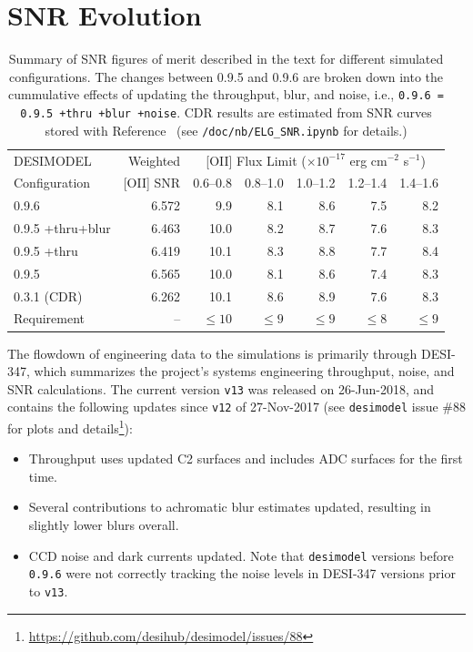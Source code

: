 \documentclass[12pt]{article}
\begin{document}
\section{SNR Evolution}

\begin{table}[htb]
\begin{center}
\begin{tabular}{lrrrrrr}
    DESIMODEL     & Weighted  & \multicolumn{5}{c}{[OII] Flux Limit ($\times 10^{-17}$ erg cm$^{-2}$ s$^{-1}$)} \\
    Configuration & [OII] SNR & 0.6--0.8 & 0.8--1.0 & 1.0--1.2 & 1.2--1.4 & 1.4--1.6 \\
    \hline
    0.9.6            &  6.572 &  9.9 &  8.1 &  8.6 &  7.5 &  8.2 \\
    0.9.5 +thru+blur &  6.463 & 10.0 &  8.2 &  8.7 &  7.6 &  8.3 \\
    0.9.5 +thru      &  6.419 & 10.1 &  8.3 &  8.8 &  7.7 &  8.4 \\
    0.9.5            &  6.565 & 10.0 &  8.1 &  8.6 &  7.4 &  8.3 \\
    0.3.1 (CDR)      &  6.262 & 10.1 &  8.6 &  8.9 &  7.6 &  8.3 \\
    \hline
    Requirement      &     -- & $\le 10$ & $\le 9$ & $\le 9$ & $\le 8$ & $\le 9$ \\
    \hline
\end{tabular}
\caption{Summary of SNR figures of merit described in the text for different simulated configurations.
The changes between 0.9.5 and 0.9.6 are broken down into the cummulative effects of updating the throughput, blur, and noise,
i.e., {\tt 0.9.6 = 0.9.5 +thru +blur +noise}.  CDR results are estimated from SNR curves stored with
Reference~\cite{desi-867} (see {\tt /doc/nb/ELG\_SNR.ipynb} for details.)}
\label{tab:results-summary}
\end{center}
\end{table}

The flowdown of engineering data to the simulations is primarily through DESI-347\cite{desi-347}, which summarizes
the project's systems engineering throughput, noise, and SNR calculations.  The current version {\tt v13} was released on 26-Jun-2018,
and contains the following updates since {\tt v12} of 27-Nov-2017 (see {\tt desimodel} issue \#88 for plots and details\footnote{
\url{https://github.com/desihub/desimodel/issues/88}}):
\begin{itemize}
    \item Throughput uses updated C2 surfaces and includes ADC surfaces for the first time.
    \item Several contributions to achromatic blur estimates updated, resulting in slightly lower blurs overall.
    \item CCD noise and dark currents updated. Note that {\tt desimodel} versions before {\tt 0.9.6} were not correctly
    tracking the noise levels in DESI-347 versions prior to {\tt v13}.
\end{itemize}
\end{document}
